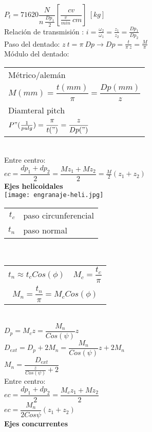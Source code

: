 \documentclass[11pt,a4paper]{article}
\begin{document}
\begin{multicols}{2}
			 $P_t=71620\dfrac{N}{n~\frac{Dp_1}{2}} \left[\dfrac{cv}{\frac{v}{min}~cm}\right]~\left[kg\right]$\\ \vspace*{0.2cm}
			Relación de transmisión : $i=\frac{\omega_2}{\omega_1}=\frac{z_1}{z_2}=\frac{Dp_1}{Dp_2}$\\ \vspace*{0.2cm}
			Paso del dentado: $z~t=\pi~Dp \rightarrow Dp=\frac{t}{\pi~z}=\frac{M}{\pi}$\\\vspace*{0.2cm}
			Módulo del dentado:\\\vspace*{0.2cm}
			\begin{centering}
				\begin{tabular}{l}
					Métrico/alemán\\
					$M(mm)=\dfrac{t(mm)}{\pi}=\dfrac{Dp(mm)}{z}$\\
					Diamteral pitch\\
					$P"(\frac{1}{pulg})=\dfrac{\pi}{t(")}=\dfrac{z}{Dp(")}$\\
				\end{tabular}
			\end{centering}\\\vspace*{0.2cm}
			Entre centro:\\
			$ec=\dfrac{dp_1+dp_2}{2}=\dfrac{M z_1+ M z_2}{2}=\frac{M}{2}(z_1+z_2)$\\



	\textbf{Ejes helicoidales}\\
	\texttt{[image: engranaje-heli.jpg]}\\
	\begin{tabular}{r l}
		$t_c$& paso circunferencial\\
		$t_n$& paso normal\\
	\end{tabular}\\
	\begin{tabular}{r l}
		$t_n\approx t_c Cos(\phi)$& $M_c=\dfrac{t_c}{\pi}$ \\
		\multicolumn{2}{c}{$M_n=\dfrac{t_n}{\pi}=M_c Cos(\phi)$}\\
	\end{tabular}\\
	
	$D_p=M_c z= \dfrac{M_n}{Cos(\psi)}z$\\
	$D_{ext}=D_p+2M_n =\dfrac{M_n}{Cos(\psi)}z+2M_n$\\
	$M_n=\dfrac{D_{ext}}{\frac{z}{Cos(\psi)}+2}$\\\vspace*{0.2cm}
	Entre centro:\\\vspace*{0.2cm}
	$ec=\dfrac{dp_1+dp_2}{2}=\dfrac{M_c z_1+ M z_2}{2}$\\
	$ec=\dfrac{M_n}{2 Cos{\psi}}(z_1+z_2)$\\
	\vspace*{0.2cm}
		\textbf{Ejes concurrentes}\\



\end{multicols}
\end{document}
